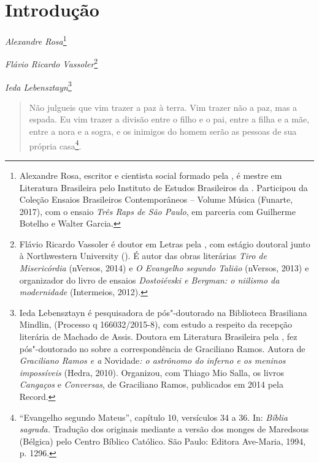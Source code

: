 
\chapter{Introdução}


\begin{flushright}
\emph{Alexandre Rosa}\footnote{Alexandre Rosa, escritor e
  cientista social formado pela , é mestre em Literatura
  Brasileira pelo Instituto de Estudos Brasileiros da . Participou da
  Coleção Ensaios Brasileiros Contemporâneos -- Volume Música (Funarte,
  2017), com o ensaio \emph{Três Raps de São Paulo}, em parceria com
  Guilherme Botelho e Walter Garcia.}

\emph{Flávio Ricardo Vassoler}\footnote{Flávio Ricardo Vassoler
  é doutor em Letras pela , com estágio doutoral junto à
  Northwestern University (). É autor das obras literárias \emph{Tiro
  de Misericórdia} (nVersos, 2014) e \emph{O Evangelho segundo Talião}
  (nVersos, 2013) e organizador do livro de ensaios \emph{Dostoiévski e
  Bergman: o niilismo da modernidade} (Intermeios, 2012).}

\emph{Ieda Lebensztayn}\footnote{Ieda Lebensztayn é
  pesquisadora de pós"-doutorado na Biblioteca Brasiliana Mindlin,
   (Processo q 166032/2015-8), com estudo a
  respeito da recepção literária de Machado de Assis. Doutora em
  Literatura Brasileira pela , fez pós"-doutorado no 
  sobre a correspondência de Graciliano Ramos. Autora de
  \emph{Graciliano Ramos e a} Novidade\emph{: o astrônomo do inferno e
  os meninos impossíveis} (Hedra, 2010). Organizou, com Thiago Mio
  Salla, os livros \emph{Cangaços} e \emph{Conversas}, de Graciliano
  Ramos, publicados em 2014 pela Record.}
\end{flushright}

\begin{quote}
Não julgueis que vim trazer a paz à terra. Vim trazer não a paz, mas a
espada. Eu vim trazer a divisão entre o filho e o pai, entre a filha e a
mãe, entre a nora e a sogra, e os inimigos do homem serão as pessoas de
sua própria casa\footnote{``Evangelho segundo Mateus'', capítulo 10,
  versículos 34 a 36. In: \emph{Bíblia sagrada.} Tradução dos originais
  mediante a versão dos monges de Maredsous (Bélgica) pelo Centro
  Bíblico Católico. São Paulo: Editora Ave-Maria, 1994, p. 1296.}.
\end{quote}

